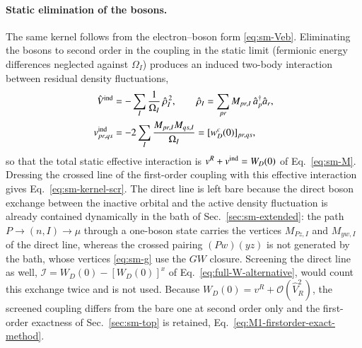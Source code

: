 \documentclass[aip,jcp,reprint,noshowkeys,superscriptaddress]{revtex4-1}
\begin{document}
\paragraph{Static elimination of the bosons.}
The same kernel follows from the electron--boson form \eqref{eq:sm-Veb}.
Eliminating the bosons to second order in the coupling in the static limit
(fermionic energy differences neglected against $\Omega_I$) produces an
induced two-body interaction between residual density fluctuations,
\begin{align}
  \hat V^{\rm ind}&=-\sum_I\frac{1}{\Omega_I}\,\hat\rho_I^{\,2},\qquad
  \hat\rho_I=\sum_{pr}M_{pr,I}\,\hat a_p^\dagger\hat a_r ,
  \label{eq:sm-Vind}\\
  v^{\rm ind}_{pr,qs}&=-2\sum_I\frac{M_{pr,I}M_{qs,I}}{\Omega_I}
  =[w^{c}_D(0)]_{pr,qs},
  \nonumber
\end{align}
so that the total static effective interaction is $v^R+v^{\rm ind}=W_D(0)$
of Eq.~\eqref{eq:sm-M}.  Dressing the crossed line of the first-order
coupling with this effective interaction gives
Eq.~\eqref{eq:sm-kernel-scr}.  The direct line is left bare because the
direct boson exchange between the inactive orbital and the active density
fluctuation is already contained dynamically in the bath of
Sec.~\ref{sec:sm-extended}: the path $P\to(n,I)\to\mu$ through a one-boson
state carries the vertices $M_{Pz,I}$ and $M_{yw,I}$ of the direct line,
whereas the crossed pairing $(Pw)(yz)$ is not generated by the bath, whose
vertices \eqref{eq:sm-g} use the $GW$ closure.  Screening the direct line as
well, $\mathcal I=W_D(0)-[W_D(0)]^{x}$ of Eq.~\eqref{eq:full-W-alternative},
would count this exchange twice and is not used.  Because
$W_D(0)=v^R+\mathcal O(\hat V_R^{2})$, the screened coupling differs from the
bare one at second order only and the first-order exactness of
Sec.~\ref{sec:sm-top} is retained, Eq.~\eqref{eq:M1-firstorder-exact-method}.
\end{document}
